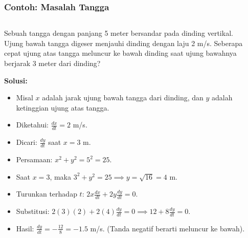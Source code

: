 \documentclass{../../kalkulus-ppt}
\begin{document}
\begin{frame}
  \frametitle{Contoh: Masalah Tangga}
  \begin{columns}[T]
    \begin{column}{0.5\textwidth}
      \begin{contoh}
        Sebuah tangga dengan panjang 5 meter bersandar pada dinding vertikal. Ujung bawah tangga digeser menjauhi dinding dengan laju 2 m/s. Seberapa cepat ujung atas tangga meluncur ke bawah dinding saat ujung bawahnya berjarak 3 meter dari dinding?
      \end{contoh}
      \pause
      \textbf{Solusi:}
      \begin{itemize}
        \item Misal $x$ adalah jarak ujung bawah tangga dari dinding, dan $y$ adalah ketinggian ujung atas tangga.
        \item Diketahui: $\frac{dx}{dt} = 2$ m/s.
        \item Dicari: $\frac{dy}{dt}$ saat $x=3$ m.
        \item Persamaan: $x^2 + y^2 = 5^2 = 25$.
        \item Saat $x=3$, maka $3^2 + y^2 = 25 \implies y = \sqrt{16} = 4$ m.
        \item Turunkan terhadap $t$: $2x \frac{dx}{dt} + 2y \frac{dy}{dt} = 0$.
        \item Substitusi: $2(3)(2) + 2(4)\frac{dy}{dt} = 0 \implies 12 + 8\frac{dy}{dt} = 0$.
        \item Hasil: $\frac{dy}{dt} = -\frac{12}{8} = -1.5$ m/s. (Tanda negatif berarti meluncur ke bawah).
      \end{itemize}
    \end{column}
    \begin{column}{0.5\textwidth}
      \centering
    \end{column}
  \end{columns}
\end{frame}
\end{document}
